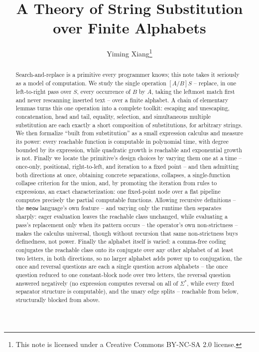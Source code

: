 \documentclass[runningheads,envcountsect]{llncs}
\title{A Theory of String Substitution over Finite Alphabets}
\author{Yiming Xiang\thanks{This note is licensed under a Creative Commons BY-NC-SA 2.0 license.}}
\institute{}
\begin{document}
\maketitle

\begin{abstract}
Search-and-replace is a primitive every programmer knows; this note takes it seriously as a model of computation. We study the single operation $[A/B]S$ -- replace, in one left-to-right pass over $S$, every occurrence of $B$ by $A$, taking the leftmost match first and never rescanning inserted text -- over a finite alphabet. A chain of elementary lemmas turns this one operation into a complete toolkit: escaping and unescaping, concatenation, head and tail, equality, selection, and simultaneous multiple substitution are each exactly a short composition of substitutions, for arbitrary strings. We then formalize ``built from substitution'' as a small expression calculus and measure its power: every reachable function is computable in polynomial time, with degree bounded by its expression, while quadratic growth is reachable and exponential growth is not. Finally we locate the primitive's design choices by varying them one at a time -- once-only, positional, right-to-left, and iteration to a fixed point -- and then admitting both directions at once, obtaining concrete separations, collapses, a single-function collapse criterion for the union, and, by promoting the iteration from rules to expressions, an exact characterization: one fixed-point node over a flat pipeline computes precisely the partial computable functions. Allowing recursive definitions -- the \texttt{meow} language's own feature -- and varying only the runtime then separates sharply: eager evaluation leaves the reachable class unchanged, while evaluating a pass's replacement only when its pattern occurs -- the operator's own non-strictness -- makes the calculus universal, though without recursion that same non-strictness buys definedness, not power. Finally the alphabet itself is varied: a comma-free coding conjugates the reachable class onto its conjugate over any other alphabet of at least two letters, in both directions, so no larger alphabet adds power up to conjugation, the once and reversal questions are each a single question across alphabets -- the once question reduced to one constant-block node over two letters, the reversal question answered negatively (no expression computes reversal on all of $\Sigma^*$, while every fixed separator structure is computable), and the unary edge splits -- reachable from below, structurally blocked from above.

\end{abstract}
\end{document}
